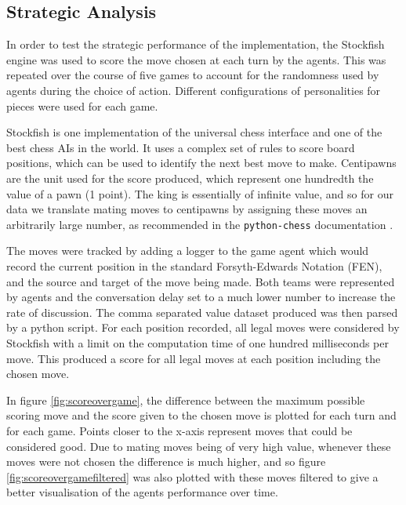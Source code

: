 \documentclass{article}
\begin{document}
\subsection{Strategic Analysis} \label{ss:sa}

In order to test the strategic performance of the implementation, the Stockfish engine \cite{stockfish} was used to score the move chosen at each turn by the agents. This was repeated over the course of five games to account for the randomness used by agents during the choice of action. Different configurations of personalities for pieces were used for each game.

Stockfish is one implementation of the universal chess interface and one of the best chess AIs in the world. It uses a complex set of rules to score board positions, which can be used to identify the next best move to make. Centipawns are the unit used for the score produced, which represent one hundredth the value of a pawn (1 point). The king is essentially of infinite value, and so for our data we translate mating moves to centipawns by assigning these moves an arbitrarily large number, as recommended in the \lstinline{python-chess} documentation \cite{pythonchess}. 

The moves were tracked by adding a logger to the game agent which would record the current position in the standard Forsyth-Edwards Notation (FEN), and the source and target of the move being made. Both teams were represented by agents and the conversation delay set to a much lower number to increase the rate of discussion. The comma separated value dataset produced was then parsed by a python script. For each position recorded, all legal moves were considered by Stockfish with a limit on the computation time of one hundred milliseconds per move. This produced a score for all legal moves at each position including the chosen move.

In figure \ref{fig:scoreovergame}, the difference between the maximum possible scoring move and the score given to the chosen move is plotted for each turn and for each game. Points closer to the x-axis represent moves that could be considered good. Due to mating moves being of very high value, whenever these moves were not chosen the difference is much higher, and so figure \ref{fig:scoreovergamefiltered} was also plotted with these moves filtered to give a better visualisation of the agents performance over time.
\end{document}
